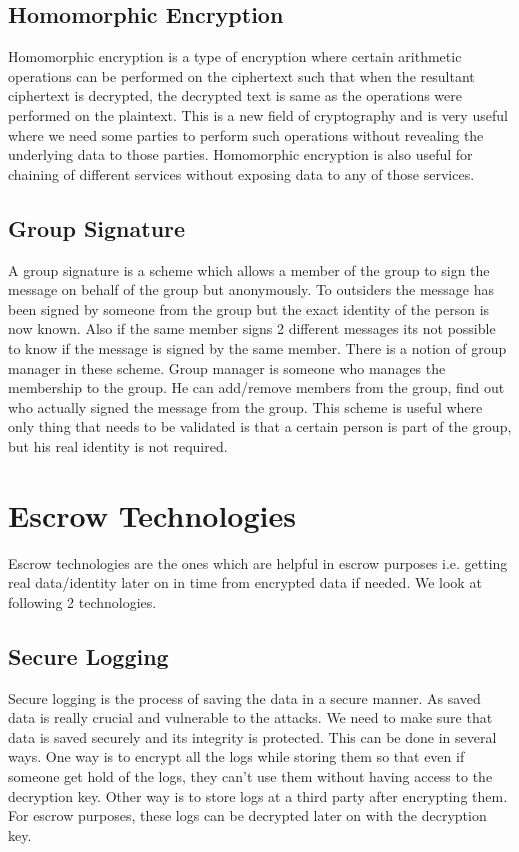 \subsection{Homomorphic Encryption}
Homomorphic encryption is a type of encryption where certain arithmetic operations can be performed on the ciphertext such that when the resultant ciphertext is decrypted, the decrypted text is same as the operations were performed on the plaintext. This is a new field of cryptography and is very useful where we need some parties to perform such operations without revealing the underlying data to those parties. Homomorphic encryption is also useful for chaining of different services without exposing data to any of those services.
\subsection{Group Signature}
A group signature is a scheme which allows a member of the group to sign the message on behalf of the group but anonymously. To outsiders the message has been signed by someone from the group but the exact identity of the person is now known. Also if the same member signs 2 different messages its not possible to know if the message is signed by the same member. There is a notion of group manager in these scheme. Group manager is someone who manages the membership to the group. He can add/remove members from the group, find out who actually signed the message from the group. This scheme is useful where only thing that needs to be validated is that a certain person is part of the group, but his real identity is not required.
\section{Escrow Technologies}
Escrow technologies are the ones which are helpful in escrow purposes i.e. getting real data/identity later on in time from encrypted data if needed. We look at following 2 technologies.
\subsection{Secure Logging}
Secure logging is the process of saving the data in a secure manner. As saved data is really crucial and vulnerable to the attacks. We need to make sure that data is saved securely and its integrity is protected. This can be done in several ways. One way is to encrypt all the logs while storing them so that even if someone get hold of the logs, they can't use them without having access to the decryption key. Other way is to store logs at a third party after encrypting them. For escrow purposes, these logs can be decrypted later on with the decryption key.
